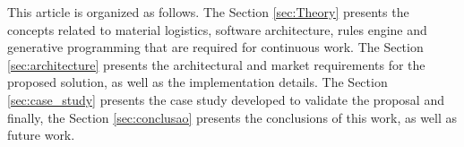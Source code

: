 
This article is organized as follows. The Section \ref{sec:Theory} presents the concepts related to material logistics, software architecture, rules engine and generative programming that are required for continuous work. The Section \ref{sec:architecture} presents the architectural and market requirements for the proposed solution, as well as the implementation details. The Section \ref{sec:case_study} presents the case study developed to validate the proposal and finally, the Section \ref{sec:conclusao} presents the conclusions of this work, as well as future work.

